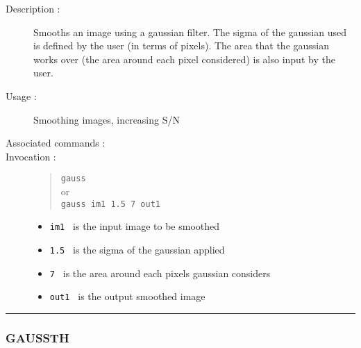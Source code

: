\begin{description}

\item[Description :] Smooths an image using a gaussian filter.  The
sigma of the gaussian used is defined by the user (in terms of
pixels).  The area that the gaussian works over (the area around each
pixel considered) is also input by the user.

\item[Usage :] Smoothing images, increasing S/N
\item[Associated commands :] {\tt {}}
\item[Invocation :]

\begin{quote}{\tt  gauss }\\
or \\
{\tt gauss im1 1.5 7 out1 }
\end{quote}

\begin{itemize}

\item {\tt im1 } is the input image to be smoothed
\item {\tt 1.5 } is the sigma of the gaussian applied
\item {\tt 7 } is the area around each pixels gaussian considers
\item {\tt out1 } is the output smoothed image
\end{itemize}

\end{description}

\hrule 
\subsubsection*{\label{GAUSSTH}GAUSSTH}

